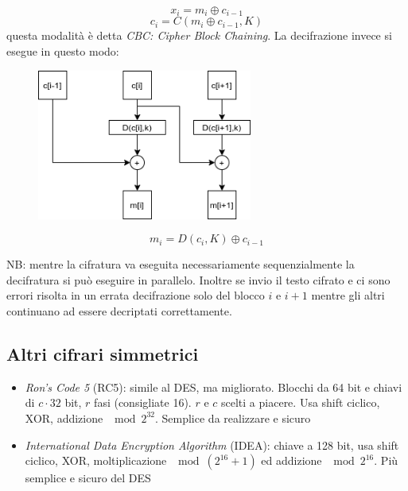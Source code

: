 $$
    x_{i} = m_{i} \oplus c_{i-1}
$$
$$
    c_{i} = C(m_{i} \oplus c_{i-1}, K)
$$
questa modalità è detta \emph{CBC: Cipher Block Chaining}.
La decifrazione invece si esegue in questo modo:
\begin{figure}[H]
    \centering
    \includegraphics[width = 200pt]{CBC_2.png}
\end{figure}

$$
    m_i = D(c_i, K) \oplus c_{i-1}
$$

NB: mentre la cifratura va eseguita necessariamente sequenzialmente la decifratura si può eseguire in parallelo.
Inoltre se invio il testo cifrato e ci sono errori risolta in un errata decifrazione solo del blocco $i$ e $i+1$ mentre gli altri continuano ad essere decriptati correttamente.

\subsection{Altri cifrari simmetrici}
\begin{itemize}
    \item \emph{Ron's Code 5} (RC5): simile al DES, ma migliorato.
    Blocchi da 64 bit e chiavi di $c \cdot 32$ bit, $r$ fasi (consigliate 16). $r$ e $c$ scelti a piacere. Usa shift ciclico, XOR, addizione $\mod 2^{32}$. Semplice da realizzare e sicuro
    \item \emph{International Data Encryption Algorithm} (IDEA): chiave a 128 bit, usa shift ciclico, XOR, moltiplicazione $\mod (2^{16} + 1)$ ed addizione $\mod 2^{16}$. Più semplice e sicuro del DES
\end{itemize}